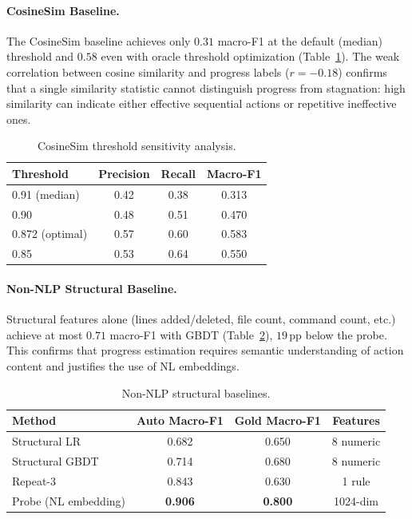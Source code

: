 \documentclass[11pt]{article}
\begin{document}
\paragraph{CosineSim Baseline.}
The CosineSim baseline achieves only $0.31$ macro-F1 at the default (median) threshold and $0.58$ even with oracle threshold optimization (Table~\ref{tab:cosinesim}).
The weak correlation between cosine similarity and progress labels ($r = -0.18$) confirms that a single similarity statistic cannot distinguish progress from stagnation: high similarity can indicate either effective sequential actions or repetitive ineffective ones.

\begin{table}[t]
\centering
\caption{CosineSim threshold sensitivity analysis.}
\label{tab:cosinesim}
\small
\begin{tabular}{lccc}
\toprule
Threshold & Precision & Recall & Macro-F1 \\
\midrule
0.91 (median) & 0.42 & 0.38 & 0.313 \\
0.90 & 0.48 & 0.51 & 0.470 \\
0.872 (optimal) & 0.57 & 0.60 & 0.583 \\
0.85 & 0.53 & 0.64 & 0.550 \\
\bottomrule
\end{tabular}
\end{table}

\paragraph{Non-NLP Structural Baseline.}
Structural features alone (lines added/deleted, file count, command count, etc.) achieve at most $0.71$ macro-F1 with GBDT (Table~\ref{tab:structural}), $19$\,pp below the probe.
This confirms that progress estimation requires semantic understanding of action content and justifies the use of NL embeddings.

\begin{table}[t]
\centering
\caption{Non-NLP structural baselines.}
\label{tab:structural}
\small
\begin{tabular}{lccc}
\toprule
Method & Auto Macro-F1 & Gold Macro-F1 & Features \\
\midrule
Structural LR & 0.682 & 0.650 & 8 numeric \\
Structural GBDT & 0.714 & 0.680 & 8 numeric \\
Repeat-3 & 0.843 & 0.630 & 1 rule \\
Probe (NL embedding) & \textbf{0.906} & \textbf{0.800} & 1024-dim \\
\bottomrule
\end{tabular}
\end{table}
\end{document}
